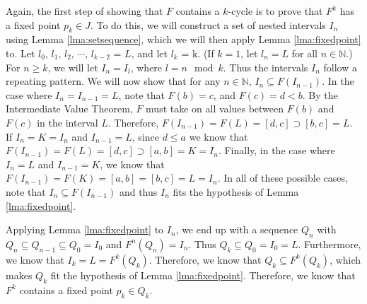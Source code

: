 \documentclass[12pt]{IEEEtran}
\begin{document}

Again, the first step of showing that $F$ contains a $k$-cycle is to prove that $F^k$ has a fixed point $p_k \in J$. To do this, we will construct a set of nested intervals $I_n$  using Lemma \ref{lma:setsequence}, which we will then apply Lemma \ref{lma:fixedpoint} to. Let $l_0$, $l_1$, $l_2$, $\cdots$, $l_{k-2}$ = $L$, and let $l_k$ = k. (If $k=1$, let $l_n = L$ for all $n \in \mathbb{N}$.) For $n \geq k$, we will let $I_n = I_l$, where $l = n \mod k$. Thus the intervals $I_n$ follow a repeating pattern. We will now show that for any $n \in \mathbb{N}$, $I_n \subseteq F \left( I_{n-1} \right)$. In the case where $I_n = I_{n-1} = L$, note that $F \left( b \right) = c$, and $F \left( c \right) = d < b$. By the Intermediate Value Theorem, $F$ must take on all values between $F \left( b \right)$ and $F \left( c \right)$ in the interval $L$. Therefore, $F \left( I_{n-1} \right) = F \left( L \right) = [d, c] \supset \left[ b,c \right] = L$. If $I_n = K = I_n$ and $I_{n-1} = L$, since $d \leq a$ we know that $F \left( I_{n-1} \right) = F \left( L \right) = [d, c] \supset \left[ a,b \right] = K = I_n$. Finally, in the case where $I_n = L$ and $I_{n-1} = K$, we know that $F \left( I_{n-1} \right) = F \left( K \right) = [a, b] = \left[ b,c \right] = L = I_n$. In all of these possible cases, note that $I_n \subseteq F \left( I_{n-1} \right)$ and thus $I_n$ fits the hypothesis of Lemma \ref{lma:fixedpoint}.

Applying Lemma \ref{lma:fixedpoint} to $I_n$, we end up with a sequence $Q_n$ with $Q_n \subseteq Q_{n-1} \subseteq Q_0 = I_0$ and $F^n \left( Q_n \right) = I_n$. Thus $Q_k \subseteq Q_0 = I_0 = L$. Furthermore, we know that $I_k = L = F^k \left( Q_k \right)$. Therefore, we know that $Q_k \subseteq F^k \left( Q_k \right)$, which makes $Q_k$ fit the hypothesis of Lemma \ref{lma:fixedpoint}. Therefore, we know that $F^k$ contains a fixed point $p_k \in Q_k$.
\end{document}
